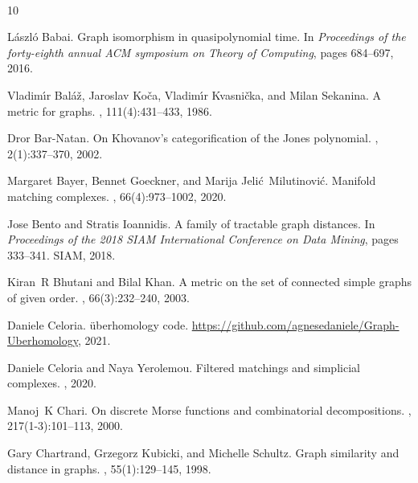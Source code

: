 \documentclass[11pt, a4paper, reqno, twoside, makeidx]{amsart}
\theoremstyle{remark}
\theoremstyle{plain}
\theoremstyle{definition}
\begin{document}
~\\










\begin{thebibliography}{10}

L{\'a}szl{\'o} Babai.
\newblock Graph isomorphism in quasipolynomial time.
\newblock In {\em Proceedings of the forty-eighth annual ACM symposium on
  Theory of Computing}, pages 684--697, 2016.

Vladim{\'\i}r Bal{\'a}{\v{z}}, Jaroslav Ko{\v{c}}a, Vladim{\'\i}r
  Kvasni{\v{c}}ka, and Milan Sekanina.
\newblock A metric for graphs.
,
  111(4):431--433, 1986.

Dror Bar-Natan.
\newblock On {K}hovanov’s categorification of the {J}ones polynomial.
, 2(1):337--370, 2002.

Margaret Bayer, Bennet Goeckner, and Marija Jeli{\'c}~Milutinovi{\'c}.
\newblock Manifold matching complexes.
, 66(4):973--1002, 2020.

Jose Bento and Stratis Ioannidis.
\newblock A family of tractable graph distances.
\newblock In {\em Proceedings of the 2018 SIAM International Conference on Data
  Mining}, pages 333--341. SIAM, 2018.

Kiran~R Bhutani and Bilal Khan.
\newblock A metric on the set of connected simple graphs of given order.
, 66(3):232--240, 2003.

Daniele Celoria.
\newblock \"uberhomology code.
\newblock \url{https://github.com/agnesedaniele/Graph-Uberhomology}, 2021.

Daniele Celoria and Naya Yerolemou.
\newblock Filtered matchings and simplicial complexes.
, 2020.

Manoj~K Chari.
\newblock On discrete {M}orse functions and combinatorial decompositions.
, 217(1-3):101--113, 2000.

Gary Chartrand, Grzegorz Kubicki, and Michelle Schultz.
\newblock Graph similarity and distance in graphs.
, 55(1):129--145, 1998.


\end{thebibliography}
\end{document}

